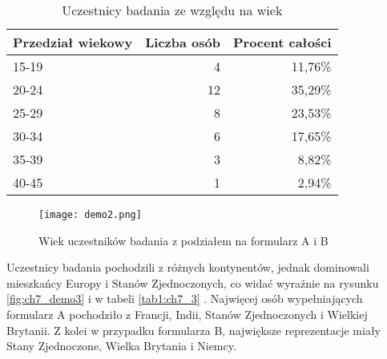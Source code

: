 \begin{table}[h!]
    \begin{center}
        \begin{tabular}{|l|r|r|}
            \hline
            Przedział wiekowy & Liczba osób & Procent całości \\
            \hline
            15-19             & 4           & 11,76\%         \\
            20-24             & 12          & 35,29\%         \\
            25-29             & 8           & 23,53\%         \\
            30-34             & 6           & 17,65\%         \\
            35-39             & 3           & 8,82\%          \\
            40-45             & 1           & 2,94\%          \\
            \hline
        \end{tabular}
    \end{center}
    \caption{Uczestnicy badania ze względu na wiek}\label{tab1:ch7_2}
\end{table}

\begin{figure}[h!]
    \centering
    \texttt{[image: demo2.png]}
    \caption{Wiek uczestników badania z podziałem na formularz A i B}
    \label{fig:ch7_demo2}
\end{figure}

\newpage

Uczestnicy badania pochodzili z różnych kontynentów, jednak dominowali mieszkańcy Europy i Stanów
Zjednoczonych, co widać wyraźnie na rysunku \ref{fig:ch7_demo3} i w tabeli \ref{tab1:ch7_3} . Najwięcej
osób wypełniających formularz A pochodziło z Francji, Indii, Stanów Zjednoczonych i Wielkiej Brytanii. Z kolei w
przypadku formularza B, największe reprezentacje miały Stany Zjednoczone, Wielka Brytania i Niemcy.

